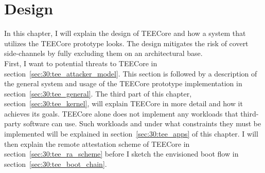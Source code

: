 \chapter{Design}
\label{sec:design}



In this chapter, I will explain the design of TEECore and how a system that
utilizes the TEECore prototype looks. The design mitigates the risk of
covert side-channels by fully excluding them on an architectural base.\\

First, I want to potential threats to TEECore in
section~\ref{sec:30:tee_attacker_model}. This section is followed by a
description of the general system and usage of the TEECore prototype
implementation in section~\ref{sec:30:tee_general}. The third part of this
chapter, section~\ref{sec:30:tee_kernel}, will explain TEECore in more detail
and how it achieves its goals. TEECore alone does not implement any workloads
that third-party software can use. Such workloads and under what constraints
they must be implemented will be explained in section~\ref{sec:30:tee_apps} of
this chapter. I will then explain the remote attestation scheme of TEECore in
section~\ref{sec:30:tee_ra_scheme} before I sketch the envisioned boot flow in
section~\ref{sec:30:tee_boot_chain}.

